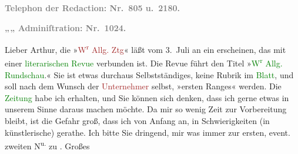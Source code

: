 \pstart
           \textcolor{gray}{\textbf{Telephon der Redaction: Nr. 805 u. 2180.}}\pend
           
\pstart
           \textcolor{gray}{\textbf{\hspace*{1.5em}„\hspace*{1.5em}„\hspace*{1.5em} Adminiſtration: Nr. 1024.}}\pend
           
\pstart{}Lieber Arthur,\pend
\pstart
           die »\textcolor{brown}{W\textsuperscript{r} Allg. Ztg}{}\ledrightnote{\textcolor{brown}{Wiener Allgemeine Zeitung}}«
               läßt vom 3. Juli an ein \label{K_L03293-1v}\label{K_L03293-1h} erscheinen, das mit einer \textcolor{green}{literarischen Revue}{}\ledrightnote{{$\rightarrow$}\textcolor{green}{Wiener Allgemeine Rundschau}} verbunden ist. Die Revue führt den Titel
                  »\textcolor{green}{W\textsuperscript{r} Allg.
                  Rundschau}{}\ledrightnote{\textcolor{green}{Wiener Allgemeine Rundschau}}.« Sie ist etwas durchaus Selbstständiges, keine Rubrik im \textcolor{green}{Blatt}{}\ledrightnote{{$\rightarrow$}\textcolor{green}{Wiener Allgemeine Montags-Zeitung}}, und soll nach dem
               Wunsch der \textcolor{brown}{Unternehmer}{}\ledrightnote{{$\rightarrow$}\textcolor{brown}{Wiener Allgemeine Zeitung}} selbst,
               »ersten Ranges« werden. Die \textcolor{green}{Zeitung}{}\ledrightnote{{$\rightarrow$}\textcolor{green}{Wiener Allgemeine Rundschau}} habe ich erhalten, und Sie können sich denken, dass ich gerne etwas
               in unserem Sinne daraus machen möchte. Da mir so wenig Zeit zur Vorbereitung bleibt,
               ist die Gefahr groß, dass ich von Anfang an, in Schwierigkeiten (in künstlerische)
               gerathe. Ich bitte Sie dringend, mir was immer zur ersten, event. zweiten N\textsuperscript{u.} zu \label{K_L03293-2v}\label{K_L03293-2h}. Großes
